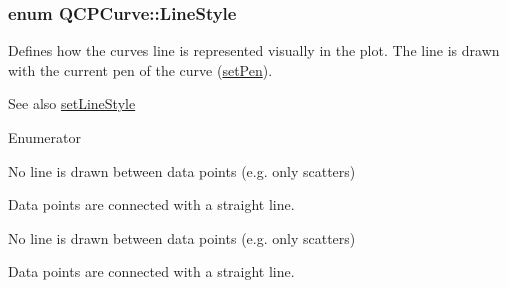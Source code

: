 \subsubsection[{\texorpdfstring{Line\+Style}{LineStyle}}]{\setlength{\rightskip}{0pt plus 5cm}enum {\bf Q\+C\+P\+Curve\+::\+Line\+Style}}\hypertarget{class_q_c_p_curve_a2710e9f79302152cff794c6e16cc01f1}{}\label{class_q_c_p_curve_a2710e9f79302152cff794c6e16cc01f1}
Defines how the curve\textquotesingle{}s line is represented visually in the plot. The line is drawn with the current pen of the curve (\hyperlink{class_q_c_p_abstract_plottable_ab74b09ae4c0e7e13142fe4b5bf46cac7}{set\+Pen}). \begin{DoxySeeAlso}{See also}
\hyperlink{class_q_c_p_curve_a4a377ec863ff81a1875c3094a6177c19}{set\+Line\+Style} 
\end{DoxySeeAlso}
\begin{Desc}
\item[Enumerator]\par
\begin{description}
\item[{\em 
ls\+None\hypertarget{class_q_c_p_curve_a2710e9f79302152cff794c6e16cc01f1a65deb77129bf07722cc01d54ddf0b6b7}{}\label{class_q_c_p_curve_a2710e9f79302152cff794c6e16cc01f1a65deb77129bf07722cc01d54ddf0b6b7}
}]No line is drawn between data points (e.\+g. only scatters) \item[{\em 
ls\+Line\hypertarget{class_q_c_p_curve_a2710e9f79302152cff794c6e16cc01f1abb5cbe337df27682d7674652057fdc58}{}\label{class_q_c_p_curve_a2710e9f79302152cff794c6e16cc01f1abb5cbe337df27682d7674652057fdc58}
}]Data points are connected with a straight line. \item[{\em 
ls\+None\hypertarget{class_q_c_p_curve_a2710e9f79302152cff794c6e16cc01f1a65deb77129bf07722cc01d54ddf0b6b7}{}\label{class_q_c_p_curve_a2710e9f79302152cff794c6e16cc01f1a65deb77129bf07722cc01d54ddf0b6b7}
}]No line is drawn between data points (e.\+g. only scatters) \item[{\em 
ls\+Line\hypertarget{class_q_c_p_curve_a2710e9f79302152cff794c6e16cc01f1abb5cbe337df27682d7674652057fdc58}{}\label{class_q_c_p_curve_a2710e9f79302152cff794c6e16cc01f1abb5cbe337df27682d7674652057fdc58}
}]Data points are connected with a straight line. \end{description}
\end{Desc}


